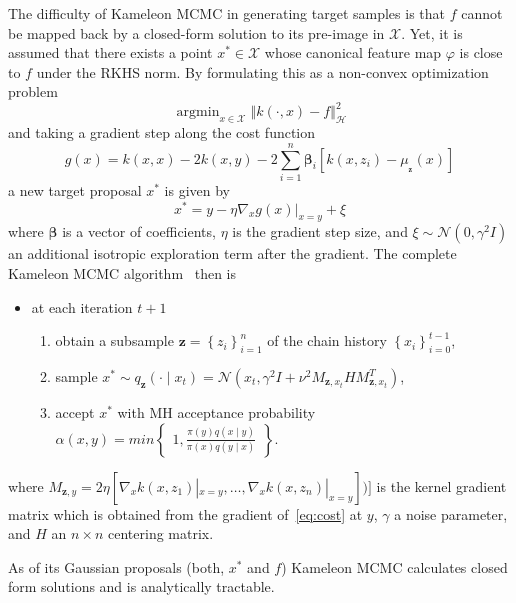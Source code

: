 \documentclass{article} %
\newcommand{\argmin}{\mathop\mathrm{argmin}}
\begin{document}
The difficulty of Kameleon MCMC in generating target samples is that $f$ 
cannot be mapped back by a closed-form solution to its pre-image 
in $\mathcal{X}$. Yet, it is assumed that there exists a point $x^{*} \in \mathcal{X}$ 
whose canonical feature map $\varphi$ is close to $f$ under the RKHS norm. 
By formulating this as a non-convex optimization problem
\begin{equation}
  \argmin_{x\in\mathcal{X}}\left\Vert k\left(\cdot,x\right)-f\right\Vert _{\mathcal{H}}^{2}
\end{equation}
and taking a gradient step along the cost function
\begin{equation}
  \label{eq:cost}
  g(x) = k(x,x) - 2k(x,y) - 2 \sum_{i=1}^{n}\mathbf{\beta}_{i}\left [ k(x,z_{i})-\mu_{\mathbf{_z}}(x) \right ]
\end{equation}
a new target proposal $x^{*}$ is given by
\begin{equation}
  x^{*} = y - \eta \nabla_{x}g(x)\rvert_{x=y} + \xi
\end{equation}
where $\mathbf{\beta}$ is a vector of coefficients, $\eta$ is the gradient step size, 
and $\xi \sim \mathcal{N}(0,\gamma^{2}I)$ an additional isotropic exploration term after 
the gradient. The complete Kameleon MCMC algorithm~\cite{sejdinovic13} then is
\begin{itemize}
  \item at each iteration $t+1$
  \begin{enumerate}
    \item obtain a subsample $\mathbf{z} = \left\{ z_{i} \right\}_{i=1}^{n}$ of the chain history $\left\{ x_{i} \right\}_{i=0}^{t-1}$,
    \item sample $x^{*} \sim q_{\mathbf{z}}(\cdot \mid x_{t}) = \mathcal{N}(x_{t},\gamma^{2}I + \nu^{2}M_{\mathbf{z},x_{t}}HM_{\mathbf{z},x_{t}}^{T})$,
    \item accept $x^{*}$ with MH acceptance probability $\alpha(x,y) = min\begin{Bmatrix}1, \frac{\pi(y) q(x \mid y)}{\pi(x) q(y \mid x)}\end{Bmatrix}$.
  \end{enumerate}
\end{itemize}
where $M_{\mathbf{z},y}=2\eta\left[\nabla_{x}k(x,z_{1})|_{x=y},\ldots,\nabla_{x}k(x,z_{n})|_{x=y}\right])]$ 
is the kernel gradient matrix which is obtained from the gradient of~\eqref{eq:cost} 
at $y$, $\gamma$ a noise parameter, and $H$ an $n \times n$ centering matrix.

As of its Gaussian proposals (both, $x^{*}$ and $f$) Kameleon MCMC calculates closed form 
solutions and is analytically tractable.
\end{document}

